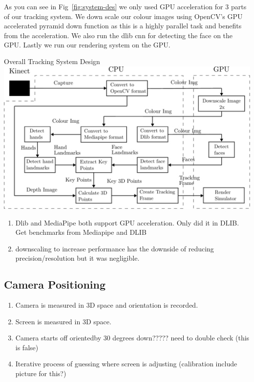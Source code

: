 As you can see in Fig~\ref{fig:system-des} we only used GPU acceleration for 3 parts of our tracking system. We down scale our colour images using OpenCV's GPU accelerated pyramid down function as this is a highly parallel task and benefits from the acceleration. We also run the dlib cnn for detecting the face on the GPU. Lastly we run our rendering system on the GPU.
\begin{figureBox}[label={fig:system-des}, width=0.8\linewidth]{Overall Tracking System Design}
    \includegraphics[width = 0.8\linewidth]{./implementation/figures/system.pdf}
\end{figureBox}

\begin{enumerate}[itemsep=-0.25em]
	\item Dlib and MediaPipe both support GPU acceleration. Only did it in DLIB. Get benchmarks from Mediapipe and DLIB
	\item downscaling to increase performance has the downside of reducing precision/resolution but it was negligible.
\end{enumerate}


\subsection{Camera Positioning}
\begin{enumerate}[itemsep=-0.25em]
	\item Camera is measured in 3D space and orientation is recorded.
	\item Screen is measured in 3D space. 
	\item Camera starts off orientedby 30 degrees down????? need to double check (this is false)
	\item Iterative process of guessing where screen is adjusting (calibration include picture for this?)
\end{enumerate}